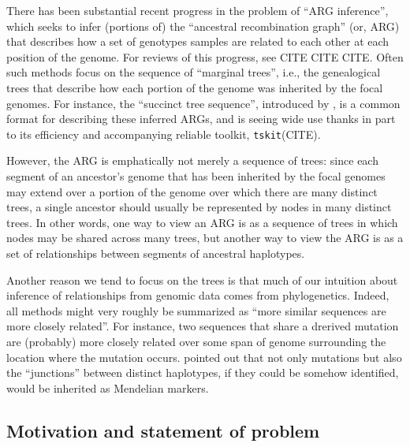 \documentclass[10pt,twoside,lineno]{gsajnl}
\newcommand{\tskit}{\texttt{tskit}}
\begin{document}
There has been substantial recent progress
in the problem of ``ARG inference'',
which seeks to infer (portions of) the ``ancestral recombination graph'' (or, ARG)
that describes how a set of genotypes samples are related to each other
at each position of the genome.
For reviews of this progress, see CITE CITE CITE.
Often such methods focus on the sequence of ``marginal trees'',
i.e., the genealogical trees that describe how each portion of the genome
was inherited by the focal genomes.
For instance, the ``succinct tree sequence'',
introduced by \citet{kelleher2016efficient},
is a common format for describing these inferred ARGs,
and is seeing wide use thanks in part to its efficiency and accompanying reliable toolkit,
\tskit (CITE).

However, the ARG is emphatically not merely a sequence of trees:
since each segment of an ancestor's genome that has been inherited by the focal genomes
may extend over a portion of the genome over which there are many distinct trees,
a single ancestor should usually be represented by nodes in many distinct trees.
In other words, one way to view an ARG is as a sequence of trees in which nodes may be shared across many trees,
but another way to view the ARG is as a set of relationships between segments of ancestral haplotypes.

Another reason we tend to focus on the trees is that
much of our intuition about inference of relationships from genomic data
comes from phylogenetics.
Indeed, all methods might very roughly be summarized as
``more similar sequences are more closely related''.
For instance, two sequences that share a drerived mutation
are (probably) more closely related over some span of genome surrounding the location where the mutation occurs.
\citet{fisher} pointed out that not only mutations
but also the ``junctions'' between distinct haplotypes,
if they could be somehow identified,
would be inherited as Mendelian markers.

\subsection{Motivation and statement of problem}

\end{document}
